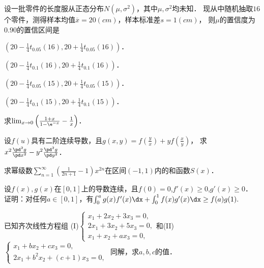 \documentclass[plain,noanswer,medmath]{../../template/jnuexam}
\begin{document}


\begin{problem}
设一批零件的长度服从正态分布$N(\mu ,\sigma^2)$，其中$\mu ,\sigma^2$均未知．
现从中随机抽取$16$个零件，测得样本均值$\overline{x} = 20(cm)$，样本标准差$s = 1(cm)$，
则$\mu$的置信度为$0.90$的置信区间是\pickout{}
\begin{abcd}
\item $\left(20 - \frac{1}{4}t_{0.05}(16),20 + \frac{1}{4}t_{0.05}(16) \right)$．
\item $\left(20 - \frac{1}{4}t_{0.1}(16),20 + \frac{1}{4}t_{0.1}(16) \right)$．
\item $\left(20 - \frac{1}{4}t_{0.05}(15),20 + \frac{1}{4}t_{0.05}(15) \right)$．
\item $\left(20 - \frac{1}{4}t_{0.1}(15),20 + \frac{1}{4}t_{0.1}(15) \right)$．
\end{abcd}
\end{problem}




\begin{problem}[points=8]
求$\lim_{x \to 0} \left(\frac{1 + x}{1 - \e^{- x}} - \frac{1}{x} \right)$．
\end{problem}


\begin{problem}[points=8]
设$f(u)$具有二阶连续导数，且$g(x,y) = f\left(\frac{y}{x} \right) + yf\left(\frac{x}{y} \right)$，
求$x^2\frac{\pd^2 g}{\pd x^2} - y^2\frac{\pd^2 g}{\pd y^2}$．
\end{problem}




\begin{problem}[points=9]
求幂级数$\sum_{n = 1}^{\infty}\left(\frac{1}{2n + 1} - 1 \right) x^{2n}$在区间$(- 1,1)$内的和函数$S(x)$．
\end{problem}


\begin{problem}[points=8]
设$f(x),g(x)$在$[0,1]$上的导数连续，且$f(0) = 0$,$f'(x) \ge 0$,$g'(x) \ge 0$．
证明：对任何$a \in[0,1]$，有$\int_0^a g(x)f'(x)\dx + \int_0^1 f(x)g'(x)\dx \ge f(a)g(1).$
\end{problem}


\begin{problem}[points=13]
已知齐次线性方程组
(I)$\begin{cases}
  x_1 + 2x_2 + 3x_3 = 0, \\
  2x_1 + 3x_2 + 5x_3 = 0, \\
  x_1 + x_2 + ax_3 = 0,
\end{cases}$和(II)$\begin{cases}
  x_1 + bx_2 + cx_3 = 0, \\
  2x_1 + b^2x_2 + (c + 1)x_3 = 0,
\end{cases}$
同解，求$a,b,c$的值．
\end{problem}
\end{document}
